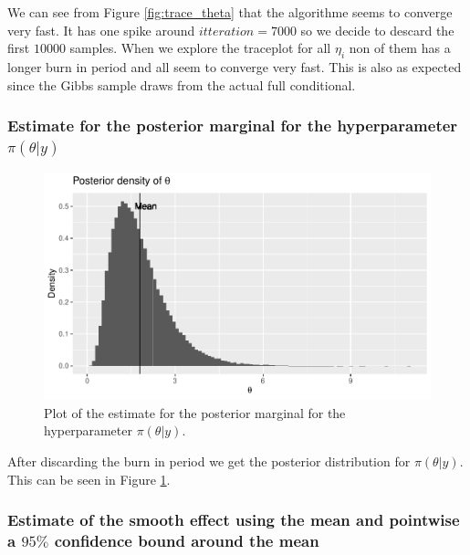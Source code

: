 We can see from Figure \ref{fig:trace_theta} that the algorithme seems to converge very fast. It has one spike around $itteration= 7000$ so we decide to descard the first $10 000$ samples. When we explore the traceplot for all $\eta_i$ non of them has a longer burn in period and all seem to converge very fast. This is also as expected since the Gibbs sample draws from the actual full conditional. 

\subsubsection{Estimate for the posterior marginal for the hyperparameter $\pi(\theta|y)$}

\begin{figure}[h!]
    \centering
    \includegraphics[width=\textwidth]{Images/post_theta_mcmc.pdf}
    \caption{Plot of the estimate for the posterior marginal for the hyperparameter $\pi(\theta|y)$.}
    \label{fig:post_theta_mcmc}
\end{figure}

After discarding the burn in period we get the posterior distribution for $\pi(\theta|y)$. This can be seen in Figure \ref{fig:post_theta_mcmc}. 

\subsubsection{Estimate of the smooth effect using the mean and pointwise a $95 \%$ confidence bound around the mean}

